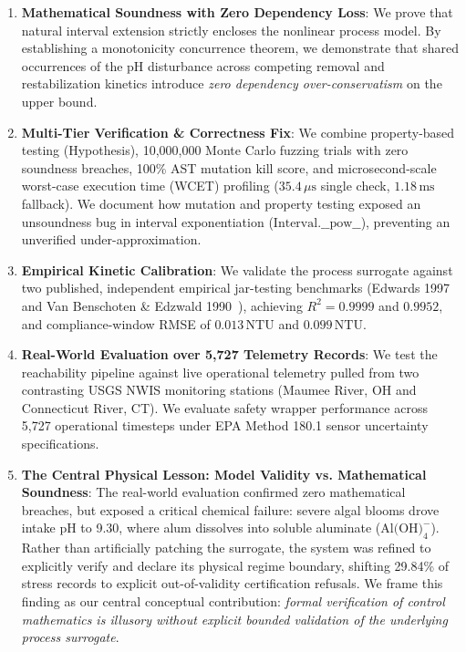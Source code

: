 \documentclass[10pt,twocolumn,letterpaper]{article}
\theoremstyle{definition}
\begin{document}
\begin{enumerate}
    \item \textbf{Mathematical Soundness with Zero Dependency Loss}: We prove that natural interval extension strictly encloses the nonlinear process model. By establishing a monotonicity concurrence theorem, we demonstrate that shared occurrences of the pH disturbance across competing removal and restabilization kinetics introduce \textit{zero dependency over-conservatism} on the upper bound.
    \item \textbf{Multi-Tier Verification \& Correctness Fix}: We combine property-based testing (Hypothesis), 10,000,000 Monte Carlo fuzzing trials with zero soundness breaches, 100\% AST mutation kill score, and microsecond-scale worst-case execution time (WCET) profiling ($35.4\,\mu\text{s}$ single check, $1.18\,\text{ms}$ fallback). We document how mutation and property testing exposed an unsoundness bug in interval exponentiation ($\text{Interval}.\_\_\text{pow}\_\_$), preventing an unverified under-approximation.
    \item \textbf{Empirical Kinetic Calibration}: We validate the process surrogate against two published, independent empirical jar-testing benchmarks (Edwards 1997~\cite{edwards1997predicting} and Van Benschoten \& Edzwald 1990~\cite{vanbenschoten1990chemical}), achieving $R^2 = 0.9999$ and $0.9952$, and compliance-window RMSE of $0.013\,\text{NTU}$ and $0.099\,\text{NTU}$.
    \item \textbf{Real-World Evaluation over 5,727 Telemetry Records}: We test the reachability pipeline against live operational telemetry pulled from two contrasting USGS NWIS monitoring stations (Maumee River, OH and Connecticut River, CT). We evaluate safety wrapper performance across 5,727 operational timesteps under EPA Method 180.1 sensor uncertainty specifications.
    \item \textbf{The Central Physical Lesson: Model Validity vs. Mathematical Soundness}: The real-world evaluation confirmed zero mathematical breaches, but exposed a critical chemical failure: severe algal blooms drove intake pH to 9.30, where alum dissolves into soluble aluminate ($\text{Al(OH)}_4^-$). Rather than artificially patching the surrogate, the system was refined to explicitly verify and declare its physical regime boundary, shifting 29.84\% of stress records to explicit out-of-validity certification refusals. We frame this finding as our central conceptual contribution: \textit{formal verification of control mathematics is illusory without explicit bounded validation of the underlying process surrogate}.
\end{enumerate}
\end{document}

